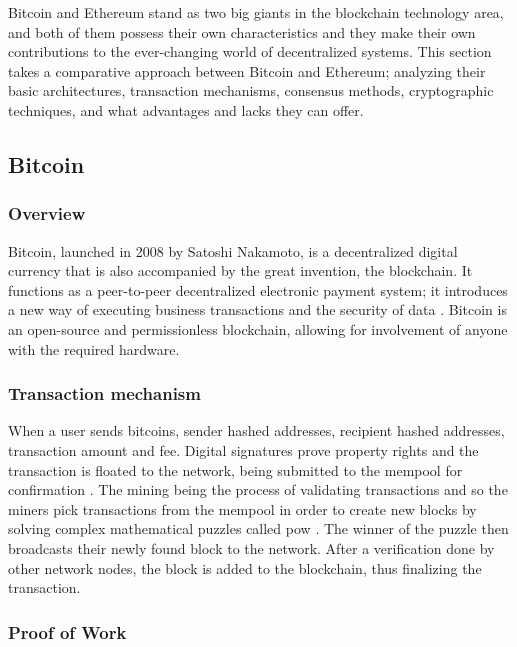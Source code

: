 Bitcoin and Ethereum stand as two big giants in the blockchain technology area, and both of them possess their own characteristics and they make their own contributions to the ever-changing world of decentralized systems.
This section takes a comparative approach between Bitcoin and Ethereum; analyzing their basic architectures, transaction mechanisms, consensus methods, cryptographic techniques, and what advantages and lacks they can offer.

\subsection{Bitcoin} \label{subsec:bitcoin}

\subsubsection{Overview}

Bitcoin, launched in 2008 by Satoshi Nakamoto, is a decentralized digital currency that is also accompanied by the great invention, the blockchain. It functions as a 
peer-to-peer decentralized electronic payment system; it introduces a new way of executing business transactions and the security of data \cite{9129332}. Bitcoin is an open-source 
and permissionless blockchain, allowing for involvement of anyone with the required hardware.

\subsubsection{Transaction mechanism}

When a user sends bitcoins, sender hashed addresses, recipient hashed addresses, transaction amount and fee. Digital signatures prove property rights and the transaction 
is floated to the network, being submitted to the mempool for confirmation \cite{bitcoincom}. The mining being the process of validating transactions and so the miners pick transactions 
from the \gls{mempool} in order to create new blocks by solving complex mathematical puzzles called \gls{pow} \cite{9129332}. The winner of the puzzle then 
broadcasts their newly found block to the network. After a verification done by other network nodes, the block is added to the blockchain, thus finalizing the transaction.

\subsubsection{Proof of Work}

